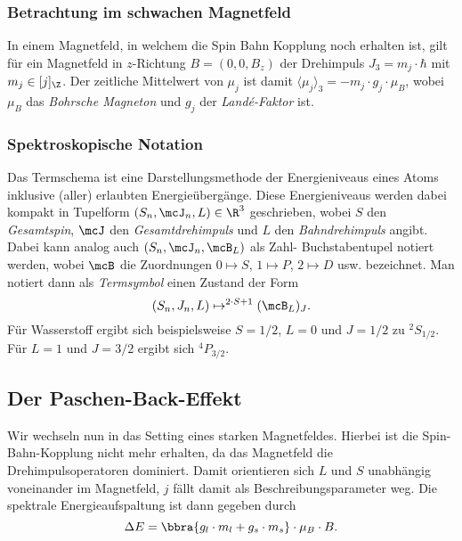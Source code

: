 \documentclass{subfiles}
\begin{document}

    \subsubsection*{Betrachtung im schwachen Magnetfeld}
        In einem Magnetfeld, in welchem die Spin Bahn Kopplung noch erhalten ist, gilt für ein Magnetfeld in $z$-Richtung $B = (0,0,B_z)$ der Drehimpuls $J_3 = m_j\cdot\hbar$ mit $m_j\in[j]_\Z$. Der zeitliche Mittelwert von $\mu_j$ ist damit $\langle\mu_j\rangle_3 = -m_j\cdot g_j\cdot\mu_B$, wobei $\mu_B$ das \emph{Bohrsche Magneton} und $g_j$ der \emph{Landé-Faktor} ist. 
        
    \subsubsection*{Spektroskopische Notation}
        Das Termschema ist eine Darstellungsmethode der Energieniveaus eines Atoms inklusive (aller) erlaubten Energieübergänge. Diese Energieniveaus werden dabei kompakt in Tupelform $(S_n,\mcJ_n,L)\in\R^3$ geschrieben, wobei $S$ den \emph{Gesamtspin}, $\mcJ$ den \emph{Gesamtdrehimpuls} und $L$ den \emph{Bahndrehimpuls} angibt. Dabei kann analog auch $(S_n,\mcJ_n,\mcB_L)$ als Zahl- Buchstabentupel notiert werden, wobei $\mcB$ die Zuordnungen $0\mapsto S$, $1\mapsto P$, $2\mapsto D$ usw. bezeichnet. Man notiert dann als \emph{Termsymbol} einen Zustand der Form
        \[
            (S_n,J_n,L) \mapsto ^{2\cdot S + 1}(\mcB_L)_J. 
        \]
        Für Wasserstoff ergibt sich beispielsweise $S = 1/2$, $L = 0$ und $J = 1/2$ zu $^2S_{1/2}$. Für $L = 1$ und $J = 3/2$ ergibt sich $^4P_{3/2}$.

    \subsection{Der Paschen-Back-Effekt}
        Wir wechseln nun in das Setting eines starken Magnetfeldes. Hierbei ist die Spin-Bahn-Kopplung nicht mehr erhalten, da das Magnetfeld die Drehimpulsoperatoren dominiert. Damit orientieren sich $L$ und $S$ unabhängig voneinander im Magnetfeld, $j$ fällt damit als Beschreibungsparameter weg. Die spektrale Energieaufspaltung ist dann gegeben durch
        \[
            \Delta E = \bbra{g_l\cdot m_l + g_s\cdot m_s}\cdot\mu_B\cdot B.
        \]
        

    
\end{document}
